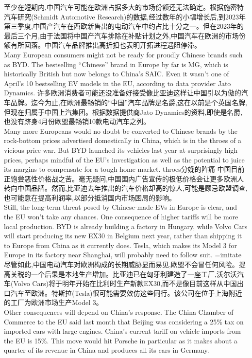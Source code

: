 \documentclass[a4paper,12pt]{article}
\begin{document}
至少在短期内,中国汽车可能在欧洲占据多大的市场份额还无法确定。根据施密特汽车研究(Schmidt Automotive Research)的数据,经过数年的小幅增长后,到2023年第三季度,中国产汽车在西欧新售出的电动汽车中约占比十分之一。但在2023年的最后三个月,由于法国将中国产汽车排除在补贴计划之外,中国汽车在欧洲的市场份额有所回落。中国汽车品牌推出高折扣也表明开拓进程遇阻停滞。
\\Many European consumers might not be ready for proudly Chinese brands such as BYD. The bestselling “Chinese” brand in Europe by far is MG, which is historically British but now belongs to China's SAIC. Even it wasn't one of April's 10 bestselling EV models in the EU, according to data provider Jato Dynamics.
许多欧洲消费者可能还没准备好接受像比亚迪这样让中国引以为傲的汽车品牌。迄今为止,在欧洲最畅销的“中国”汽车品牌是名爵,这在以前是个英国名牌,但现在归属于中国上汽集团。根据数据提供商Jato Dynamics的资料,即使是名爵,也没有跻身4月份欧盟最畅销10款电动汽车之列。
\\Many more Europeans would no doubt be converted to Chinese brands by the rock-bottom prices advertised domestically in China, which is in the throes of a vicious price war. But BYD launched its vehicles last year at surprisingly high prices, perhaps mindful of the EU's investigation as well as the potential to juice its margins to compensate for a tough home market.  throes分娩的阵痛
中国目前正饱尝恶性价格战之苦。毫无疑问,中国国内广告宣传的极低价格会让更多欧洲人转向中国品牌。然而,比亚迪去年推出的汽车价格却高的惊人,可能是顾忌欧盟调查,也可能意在提高利润率,以部分抵消国内市场困局的影响。
\\Still, the long-term threat posed by Chinese-made EVs in Europe is clear, and the EU won't take any chances. One consequence of higher tariffs will be more local production. BYD is already building a factory in Hungary, while Volvo Cars will start producing its new EX30 in Belgium next year, rather than shipping it to Europe from China as it currently does. Tesla, which makes its Model 3 for Europe in its factory near Shanghai, will probably need to follow suit. =imitate
尽管如此,中国电动汽车对欧洲构成的长期威胁显而易见,欧盟不会冒任何风险。提高关税的一个后果是本地生产增加。比亚迪已在匈牙利建造了一座工厂,沃尔沃汽车(Volvo Cars)将于明年开始在比利时生产新款EX30,而不是像目前这样从中国出口汽车至欧洲。特斯拉(Tesla)很可能需要效仿这些同行。该公司在位于上海附近的工厂为欧洲市场生产Model 3。
\\Other consequences will depend on China's response. The China Chamber of Commerce to the EU said last month that Beijing was considering a 25\% tax on imported cars with large engines. China's current tariff on vehicle imports from the EU is 15\%. This move would hit Porsche in particular as it makes about a quarter of its revenue in China and produces all its cars in Germany.
\end{document}
